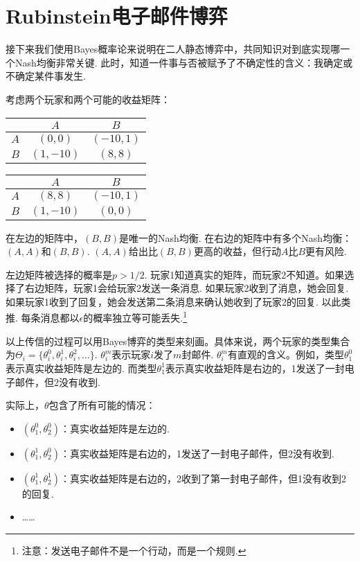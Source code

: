 \section{Rubinstein电子邮件博弈}

接下来我们使用Bayes概率论来说明在二人静态博弈中，共同知识对到底实现哪一个Nash均衡非常关键. 此时，知道一件事与否被赋予了不确定性的含义：我确定或不确定某件事发生.

考虑两个玩家和两个可能的收益矩阵：
\begin{table}[ht]
    \centering
\begin{tabular}{c|cc}
&$A$ & $B$ \\
\hline
$A$ & $(0, 0)$ & $(-10, 1)$ \\
$B$ & $(1, -10)$ & $(8, 8)$ \\
\end{tabular}
\qquad
\begin{tabular}{c|cc}
&$A$ & $B$ \\
\hline
$A$ & $(8, 8)$ & $(-10, 1)$ \\
$B$ & $(1, -10)$ & $(0, 0)$ \\
\end{tabular}
\end{table}

在左边的矩阵中，$(B,B)$是唯一的Nash均衡. 在右边的矩阵中有多个Nash均衡：$(A,A)$和$(B,B)$. $(A,A)$给出比$(B,B)$更高的收益，但行动$A$比$B$更有风险.

左边矩阵被选择的概率是$p>1/2$. 玩家1知道真实的矩阵，而玩家2不知道。如果选择了右边矩阵，玩家1会给玩家2发送一条消息. 如果玩家2收到了消息，她会回复. 如果玩家1收到了回复，她会发送第二条消息来确认她收到了玩家2的回复. 以此类推.  每条消息都以$\epsilon$的概率独立等可能丢失.\footnote{注意：发送电子邮件不是一个行动，而是一个规则.}  

以上传信的过程可以用Bayes博弈的类型来刻画。具体来说，两个玩家的类型集合为$\Theta_i = \{\theta_i^0, \theta_i^1, \theta_i^2, \dots\}$. $\theta_i^m$表示玩家$i$发了$m$封邮件. $\theta_i^m$有直观的含义。例如，类型$\theta_1^0$表示真实收益矩阵是左边的.  而类型$\theta_1^1$表示真实收益矩阵是右边的，1发送了一封电子邮件，但2没有收到. 

实际上，$\theta$包含了所有可能的情况：
\begin{itemize}
\item $(\theta_1^0, \theta_2^0)$：真实收益矩阵是左边的. 
\item $(\theta_1^1, \theta_2^0)$：真实收益矩阵是右边的，1发送了一封电子邮件，但2没有收到. 
\item $(\theta_1^1, \theta_2^1)$：真实收益矩阵是右边的，2收到了第一封电子邮件，但1没有收到2的回复. 
\item ……
\end{itemize}

